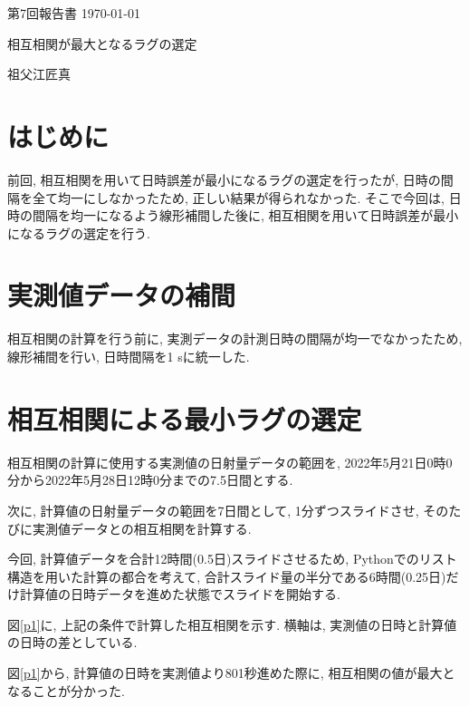 \documentclass[a4j,12pt,]{jarticle}
\begin{document}
{\noindent\small 第7回報告書 \hfill\today}
\begin{center}
  {\Large 相互相関が最大となるラグの選定}
\end{center}
\begin{flushright}
  祖父江匠真 \\
\end{flushright}

\section{はじめに}
前回, 相互相関を用いて日時誤差が最小になるラグの選定を行ったが, 日時の間隔を全て均一にしなかったため, 正しい結果が得られなかった.
そこで今回は, 日時の間隔を均一になるよう線形補間した後に, 相互相関を用いて日時誤差が最小になるラグの選定を行う.

\section{実測値データの補間}
相互相関の計算を行う前に, 実測データの計測日時の間隔が均一でなかったため, 線形補間を行い, 日時間隔を1 \si{\second}に統一した.

\section{相互相関による最小ラグの選定}
相互相関の計算に使用する実測値の日射量データの範囲を, 2022年5月21日0時0分から2022年5月28日12時0分までの7.5日間とする.

次に, 計算値の日射量データの範囲を7日間として, 1分ずつスライドさせ, そのたびに実測値データとの相互相関を計算する.

今回, 計算値データを合計12時間(0.5日)スライドさせるため, Pythonでのリスト構造を用いた計算の都合を考えて, 合計スライド量の半分である6時間(0.25日)だけ計算値の日時データを進めた状態でスライドを開始する.

図\ref{p1}に, 上記の条件で計算した相互相関を示す.
横軸は, 実測値の日時と計算値の日時の差としている.

図\ref{p1}から, 計算値の日時を実測値より801秒進めた際に, 相互相関の値が最大となることが分かった.
\end{document}
